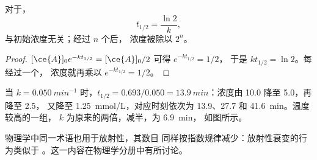 \begin{proposition}[一级反应的半衰期]\label{prop:g12:reaction-rates:half-life}
对于，
\[
  t_{1/2} = \frac{\ln 2}{k},
\]
与初始浓度无关；经过 $n$ 个后，
浓度被除以 $2^n$。
\end{proposition}

\begin{proof}
$[\ce{A}]_0 e^{-k t_{1/2}} = [\ce{A}]_0 / 2$ 可得 $e^{-k t_{1/2}} = 1/2$，
于是 $k t_{1/2} = \ln 2$。每经过一个，
浓度就再乘以 $e^{-k t_{1/2}} = 1/2$。
\end{proof}


\begin{example}[读取半衰期]\label{ex:g12:reaction-rates:half-lives}
当 $k = \qty{0.050}{min^{-1}}$ 时，$t_{1/2} = 0.693 / 0.050 =
\qty{13.9}{min}$：浓度由 10.0 降至 5.0，再降至 2.5，
又降至 \qty{1.25}{mmol/L}，对应时刻依次为 13.9、27.7 和 \qty{41.6}{min}。温度较高的一组，
$k$ 为原来的两倍，减半，为 \qty{6.9}{min}，
如图所示。
\end{example}

\begin{remark}[其他场合的半衰期]\label{rem:g12:reaction-rates:radioactive}
物理学中同一术语也用于放射性，其数目
同样按指数规律减少：放射性衰变的行为类似于
。这一内容在物理学分册中有所讨论。
\end{remark}

